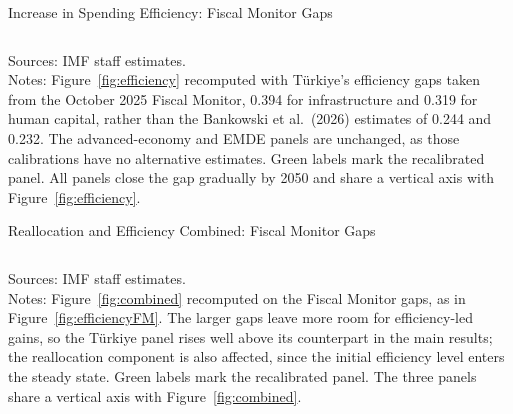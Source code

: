 \documentclass[aspectratio=169, 11pt, t]{beamer}
\begin{document}
\begin{frame}{Increase in Spending Efficiency: Fiscal Monitor Gaps}
    \vspace{0.2em}
    \label{fig:efficiencyFM}
    \begin{columns}[T]
    \end{columns}

    \vfill
    {\fontsize{5pt}{6pt}\selectfont
        Sources: IMF staff estimates. \\
        Notes: Figure~\ref{fig:efficiency} recomputed with Türkiye's efficiency gaps taken from the October 2025 Fiscal Monitor, 0.394 for infrastructure and 0.319 for human capital, rather than the Bankowski et al.\ (2026) estimates of 0.244 and 0.232. The advanced-economy and EMDE panels are unchanged, as those calibrations have no alternative estimates. Green labels mark the recalibrated panel. All panels close the gap gradually by 2050 and share a vertical axis with Figure~\ref{fig:efficiency}. \\
    }
\end{frame}

\begin{frame}{Reallocation and Efficiency Combined: Fiscal Monitor Gaps}
    \vspace{0.2em}
    \label{fig:combinedFM}
    \begin{columns}[T]
    \end{columns}

    \vfill
    {\fontsize{5pt}{6pt}\selectfont
        Sources: IMF staff estimates. \\
        Notes: Figure~\ref{fig:combined} recomputed on the Fiscal Monitor gaps, as in Figure~\ref{fig:efficiencyFM}. The larger gaps leave more room for efficiency-led gains, so the Türkiye panel rises well above its counterpart in the main results; the reallocation component is also affected, since the initial efficiency level enters the steady state. Green labels mark the recalibrated panel. The three panels share a vertical axis with Figure~\ref{fig:combined}. \\
    }
\end{frame}
\end{document}
